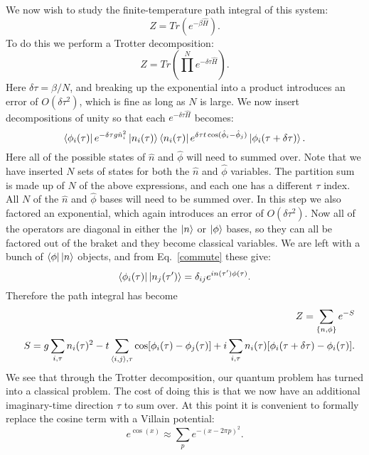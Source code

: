 We now wish to study the finite-temperature path integral of this system:
\begin{equation}
Z=Tr(e^{-\beta \hat H}).
\end{equation}
To do this we perform a Trotter decomposition\cite{Trotter}:
\begin{equation}
Z=Tr(\prod^N e^{-\delta\tau \hat H}).
\end{equation}
Here $\delta\tau=\beta/N$, and breaking up the exponential into a product introduces an error of $O(\delta\tau^2)$, which is fine as long as $N$ is large. We now insert decompositions of unity so that each $e^{-\delta\tau\hat H}$ becomes:
\begin{equation}
\bra{\phi_i(\tau)} e^{-\delta\tau g \hat n_i^2} \ket{n_i(\tau)} \bra{n_i(\tau)} e^{\delta\tau t\cos(\hat\phi_i-\hat\phi_j)} \ket{\phi_i(\tau+\delta\tau)}.
\end{equation}
Here all of the possible states of $\hat n$ and $\hat\phi$ will need to summed over. Note that we have inserted $N$ sets of states for both the $\hat n$ and $\hat\phi$ variables. 
The partition sum is made up of $N$ of the above expressions, and each one has a different $\tau$ index. All $N$ of the $\hat n$ and $\hat \phi$ bases will need to be summed over.
In this step we also factored an exponential, which again introduces an error of $O(\delta\tau^2)$. Now all of the operators are diagonal in either the $\ket{n}$ or $\ket{\phi}$ bases, so they can all be factored out of the braket and they become classical variables. We are left with a bunch of $\bra{\phi}\ket{n}$ objects, and from Eq.~\ref{commute} these give:
\begin{equation}
\bra{\phi_i(\tau)}\ket{n_j(\tau^\prime)}=\delta_{ij}e^{i n(\tau^\prime)\phi(\tau)}.
\end{equation}
Therefore the path integral has become
\begin{eqnarray}
&&Z=\sum_{\{n,\phi\}}e^{-S}\nonumber\\
&&S=g\sum_{i,\tau} n_i(\tau)^2-t\sum_{\langle i,j\rangle,\tau} \cos[ \phi_i(\tau)-\phi_j(\tau)]+i\sum_{i,\tau} n_i(\tau)[\phi_i(\tau+\delta\tau)-\phi_i(\tau)].
\label{first_classical}
\end{eqnarray}
We see that through the Trotter decomposition, our quantum problem has turned into a classical problem. The cost of doing this is that we now have an additional imaginary-time direction $\tau$ to sum over. At this point it is convenient to formally replace the cosine term with a Villain potential:
\begin{equation}
e^{\cos(x)}\approx\sum_p e^{-(x-2\pi p)^2}.
\label{Villain}
\end{equation}
